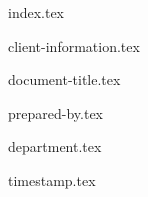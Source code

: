 
\begin{samepage}
    \thispagestyle{firstpage}

    \newcommand{\LargeFont}{\Large}

    {index.tex}

    \begin{center}
        \setlength{\parskip}{1.0\baselineskip}
        \setlength{\parindent}{0pt}

        {client-information.tex}

        {document-title.tex}

        {prepared-by.tex}

        {department.tex}

        {timestamp.tex}
    \end{center}
\end{samepage}